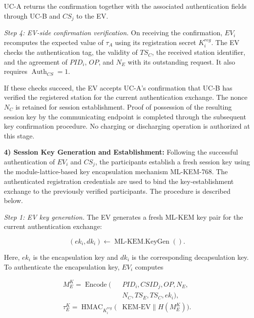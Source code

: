 \documentclass[twocolumn,10pt,journal]{IEEEtran}
\begin{document}
UC-A returns the confirmation together with
the associated authentication fields through
UC-B and $CS_j$ to the EV.

\textit{Step 4: EV-side confirmation verification.}
On receiving the confirmation, $EV_i$
recomputes the expected value of $\tau_A$
using its registration secret $K_i^{reg}$.
The EV checks the authentication tag,
the validity of $TS_C$, the received station
identifier, and the agreement of $PID_i$,
$OP$, and $N_E$ with its outstanding request.
It also requires
$\operatorname{Auth}_{CS}=1$.

If these checks succeed, the EV accepts
UC-A's confirmation that UC-B has verified
the registered station for the current
authentication exchange. The nonce $N_C$
is retained for session establishment.
Proof of possession of the resulting session
key by the communicating endpoint is
completed through the subsequent key
confirmation procedure. No charging or
discharging operation is authorized at
this stage.

\noindent\textbf{4) Session Key Generation and Establishment:}
Following the successful authentication of $EV_i$ and
$CS_j$, the participants establish a fresh session key
using the module-lattice-based key encapsulation mechanism
ML-KEM-768. The authenticated registration credentials
are used to bind the key-establishment exchange to the
previously verified participants. The procedure is
described below.

\textit{Step 1: EV key generation.}
The EV generates a fresh ML-KEM key pair for the current
authentication exchange:

\begin{equation}
(ek_i,dk_i)
\leftarrow
\operatorname{ML\mbox{-}KEM.KeyGen}().
\label{eq:qsv2g_kem_keygen}
\end{equation}

Here, $ek_i$ is the encapsulation key and $dk_i$ is
the corresponding decapsulation key. To authenticate
the encapsulation key, $EV_i$ computes

\begin{equation}
\begin{aligned}
M_E^K=\operatorname{Encode}(&PID_i,CSID_j,OP,N_E,\\
&N_C,TS_E,TS_C,ek_i),\\
\tau_E^K=\operatorname{HMAC}_{K_i^{reg}}(&\mathrm{KEM\mbox{-}EV}
\parallel H(M_E^K)).
\end{aligned}
\label{eq:qsv2g_kem_ev_proof}
\end{equation}
\end{document}
